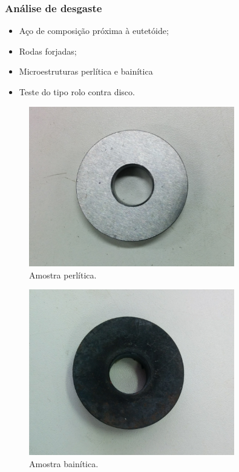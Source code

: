 \documentclass{beamer}
\begin{document}
\begin{frame}
	\frametitle{Análise de desgaste}
	
	\begin{itemize}
		\item Aço de composição próxima à eutetóide;
		\item Rodas forjadas;
		\item Microestruturas perlítica e bainítica
		\item Teste do tipo rolo contra disco.
	\end{itemize}
	
		
	\begin{minipage}[t]{0.4\textwidth}
		\begin{figure}
		\centering
		\includegraphics[width=0.8\textwidth]{amostra_perlita}
		\caption{Amostra perlítica.}
		\label{fig:amostra_perlita}
		\end{figure}
	\end{minipage}
	\hfill
	\begin{minipage}[t]{0.4\textwidth}
		\begin{figure}
		\centering
		\includegraphics[width=0.8\textwidth]{amostra_bainita}
		\caption{Amostra bainítica.}
		\label{fig:amostra_bainita}
		\end{figure}
	\end{minipage}
	
\end{frame}
\end{document}
